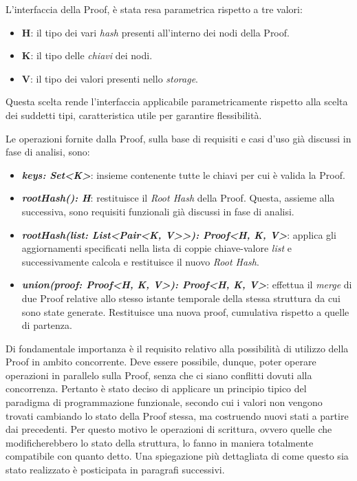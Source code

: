 		
		L'interfaccia della Proof, è stata resa parametrica rispetto a tre valori:
		
		\begin{itemize}
			\item \textbf{H}: il tipo dei vari \textit{hash} presenti all'interno dei nodi della Proof.
			\item \textbf{K}: il tipo delle \textit{chiavi} dei nodi.
			\item \textbf{V}: il tipo dei valori presenti nello \textit{storage}. 
		\end{itemize}
		
		Questa scelta rende l'interfaccia applicabile parametricamente rispetto alla scelta dei suddetti tipi, caratteristica utile per garantire flessibilità. 
		
		Le operazioni fornite dalla Proof, sulla base di requisiti e casi d'uso già discussi in fase di analisi, sono:
		\begin{itemize}
			\item \textbf{\textit{keys: Set<K>}}: insieme contenente tutte le chiavi per cui è valida la Proof.
			\item \textbf{\textit{rootHash(): H}}: restituisce il \textit{Root Hash} della Proof. Questa, assieme alla successiva, sono requisiti funzionali già discussi in fase di analisi.
			\item \textbf{\textit{rootHash(list: List<Pair<K, V>>): Proof<H, K, V>}}: applica gli aggiornamenti specificati nella lista di coppie chiave-valore \textit{list} e successivamente calcola e restituisce il nuovo \textit{Root Hash}.
			\item \textbf{\textit{union(proof: Proof<H, K, V>): Proof<H, K, V>}}: effettua il \textit{merge} di due Proof relative allo stesso istante temporale della stessa struttura da cui sono state generate. Restituisce una nuova proof, cumulativa rispetto a quelle di partenza.
		\end{itemize}
		
		Di fondamentale importanza è il requisito relativo alla possibilità di utilizzo della Proof in ambito concorrente. Deve essere possibile, dunque, poter operare operazioni in parallelo sulla Proof, senza che ci siano conflitti dovuti alla concorrenza. Pertanto è stato deciso di applicare un principio tipico del paradigma di programmazione funzionale, secondo cui i valori non vengono trovati cambiando lo stato della Proof stessa, ma costruendo nuovi stati a partire dai precedenti. Per questo motivo le operazioni di scrittura, ovvero quelle che modificherebbero lo stato della struttura, lo fanno in maniera totalmente compatibile con quanto detto. Una spiegazione più dettagliata di come questo sia stato realizzato è posticipata in paragrafi successivi.
		
